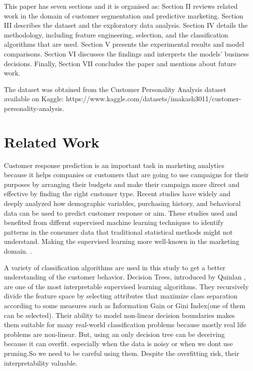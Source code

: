 \documentclass[conference]{IEEEtran}
\begin{document}
This paper has seven sections and it is organised as:
Section II reviews related work in the domain of customer segmentation and predictive marketing.
Section III describes the dataset and the exploratory data analysis.
Section IV details the methodology, including feature engineering, selection, and the classification algorithms that are used.
Section V presents the experimental results and model comparisons.
Section VI discusses the findings and interprets the models’ business decisions.
Finally, Section VII concludes the paper and mentions about future work.

The dataset was obtained from the Customer Personality Analysis dataset available on Kaggle: https://www.kaggle.com/datasets/imakash3011/customer-personality-analysis.

\section{Related Work}
\label{sec:related_work}

Customer response prediction is an important task in marketing analytics because it helps companies or customers that are going to use campaigns for their purposes by arranging their budgets and make their campaign more direct and effective by finding the right customer type.
Recent studies have widely and deeply analyzed how demographic variables, purchasing history, and behavioral data can be used to predict customer response or aim.
These studies used and benefited from differnt supervised machine learning techniques to identify  patterns in the consumer data that traditional statistical methods might not understand.
Making the supervised learning more well-known in the marketing domain. \cite{response1, response2}.

A variety of classification algorithms are used in this study to get a better understanding of the customer behavior.
Decision Trees, introduced by Quinlan \cite{quinlan1986}, are one of the most interpretable supervised learning algorithms.
They recursively divide the feature space by selecting attributes that maximize class separation according to some measures such as Information Gain or Gini Index(one of them can be selected).
Their ability to model non-linear decision boundaries makes them suitable for many real-world classification problems because mostly real life problems are non-linear.
But, using an only decision tree can be deceiving because it can overfit. especially when the data is noisy or when we dont use pruning.So we need to be careful using them. Despite the overfitting risk, their interpretability valuable.
\end{document}
